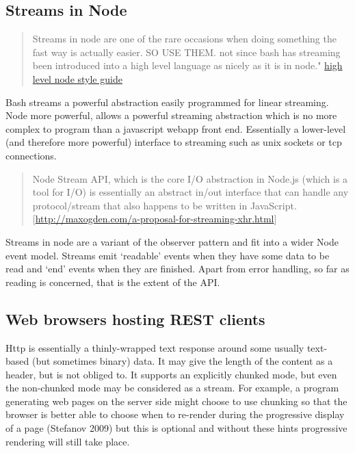 \documentclass[]{article}
\begin{document}
\subsection{Streams in Node}

\begin{quote}
Streams in node are one of the rare occasions when doing something the
fast way is actually easier. SO USE THEM. not since bash has streaming
been introduced into a high level language as nicely as it is in node."
\href{https://gist.github.com/2401787}{high level node style guide}
\end{quote}

Bash streams a powerful abstraction easily programmed for linear
streaming. Node more powerful, allows a powerful streaming abstraction
which is no more complex to program than a javascript webapp front end.
Essentially a lower-level (and therefore more powerful) interface to
streaming such as unix sockets or tcp connections.

\begin{quote}
Node Stream API, which is the core I/O abstraction in Node.js (which is
a tool for I/O) is essentially an abstract in/out interface that can
handle any protocol/stream that also happens to be written in
JavaScript.
{[}\url{http://maxogden.com/a-proposal-for-streaming-xhr.html}{]}
\end{quote}

Streams in node are a variant of the observer pattern and fit into a
wider Node event model. Streams emit `readable' events when they have
some data to be read and `end' events when they are finished. Apart from
error handling, so far as reading is concerned, that is the extent of
the API.

\subsection{Web browsers hosting REST clients}

Http is essentially a thinly-wrapped text response around some usually
text-based (but sometimes binary) data. It may give the length of the
content as a header, but is not obliged to. It supports an explicitly
chunked mode, but even the non-chunked mode may be considered as a
stream. For example, a program generating web pages on the server side
might choose to use chunking so that the browser is better able to
choose when to re-render during the progressive display of a page
(Stefanov 2009) but this is optional and without these hints progressive
rendering will still take place.
\end{document}
